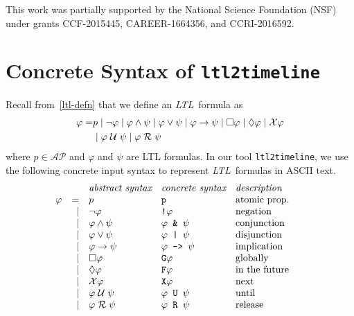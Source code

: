 \documentclass[conference]{IEEEtran}
\theoremstyle{definition}
\theoremstyle{remark}
\newcommand{\AP}{\mathcal{AP}}
\newcommand{\always}{\Box}
\newcommand{\eventually}{\Diamond}
\newcommand{\nextt}{\mathcal{X}}
\newcommand{\limplies}{\rightarrow}
\newcommand{\ltl}{\textit{LTL}}
\newcommand{\stronguntil}{\hspace{0.1cm} \mathcal{U}  \hspace{0.1cm}}
\newcommand{\weakrelease}{\hspace{0.1cm} \mathcal{R} \hspace{0.1cm}}
\newcommand{\tool}{\texttt{ltl2timeline}}
\begin{document}
This work was partially supported by the National Science Foundation (NSF) under grants CCF-2015445, CAREER-1664356, and CCRI-2016592.

\appendix
\section{Concrete Syntax of \tool} \label{sec:concrete-syntax}
Recall from~\ref{ltl-defn} that we define an \ltl\ formula as
\begin{align*}
    \varphi = & p \mid \neg \varphi \mid \varphi \land \psi \mid \varphi \lor \psi \mid \varphi \limplies \psi \mid \always \varphi \mid \eventually \varphi \mid \nextt \varphi \\ & \mid \varphi \stronguntil \psi \mid \varphi \weakrelease \psi
\end{align*}
where $p \in \AP$ and $\varphi$ and $\psi$ are LTL formulas. In our tool \tool, we use the following concrete input syntax to represent \ltl\ formulas in ASCII text.
\[
    \begin{array}{c r l l l@{\qquad} l}
         &      & \textit{abstract syntax}              & \textit{concrete syntax}                       & \textit{description} \\
    \varphi & =  & p                                     & \texttt{p}                                     & \text{atomic prop.} \\
         & \mid & \neg \varphi                             & \texttt{!} \varphi                                & \text{negation} \\
         & \mid & \varphi \land \psi                       & \varphi \texttt{ \& } \psi                        & \text{conjunction} \\
         & \mid & \varphi \lor \psi                        & \varphi \texttt{ | } \psi                         & \text{disjunction} \\
         & \mid & \varphi \limplies \psi                   & \varphi \texttt{ -> } \psi                        & \text{implication} \\
         & \mid & \always \varphi                          & \texttt{G} \varphi                                & \text{globally} \\
         & \mid & \eventually \varphi                      & \texttt{F} \varphi                                & \text{in the future} \\
         & \mid & \nextt \varphi                           & \texttt{X} \varphi                                & \text{next} \\
         & \mid & \varphi \stronguntil \psi                & \varphi \texttt{ U } \psi                         & \text{until} \\
         & \mid & \varphi \weakrelease \psi                & \varphi \texttt{ R } \psi                         & \text{release} \\
    \end{array}
\]


\end{document}
